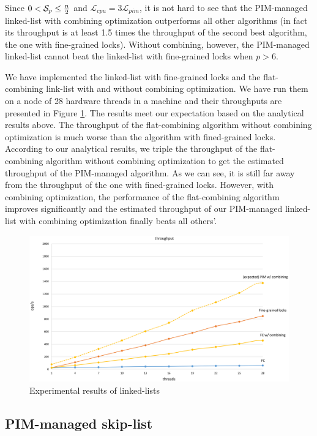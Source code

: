 \documentclass[11pt, letterpaper]{article}   	%
\newcommand{\latpim} {\mathcal{L}_{pim}}
\newcommand{\latcpu} {\mathcal{L}_{cpu}}
\newcommand{\Sp}{\mathcal{S}_{p}}
\begin{document}
Since $0 < \Sp \le {n \over 2}$ and $\latcpu = 3\latpim$,
it is not hard to see that the PIM-managed linked-list with
combining optimization outperforms all other algorithms
(in fact its throughput is at least 1.5 times the throughput of
the second best algorithm, the one with fine-grained locks).
Without combining, however, the PIM-managed linked-list cannot
beat the linked-list with fine-grained locks when $p > 6$.

We have implemented the linked-list with fine-grained locks
and the flat-combining link-list with and without combining optimization.
We have run them on a node of 28 hardware threads in a machine
and their throughputs are presented in Figure \ref{figure:linkedlist_data}.
The results meet our expectation based on the analytical results above.
The throughput of the flat-combining algorithm without combining optimization
is much worse than the algorithm with fined-grained locks.
According to our analytical results, we triple the throughput of the
flat-combining algorithm without combining optimization to get the estimated
throughput of the PIM-managed algorithm. As we can see,
it is still far away from the throughput of the one with fined-grained locks.
However, with combining optimization, the performance of the flat-combining
algorithm improves significantly and the estimated throughput of our PIM-managed
linked-list with combining optimization finally beats all others'.

\begin{figure}[ht!]
\centering
\includegraphics[width=.8\linewidth]{linkedlist_data.eps}
\caption{Experimental results of linked-lists}
\label{figure:linkedlist_data}
\end{figure}

\subsection{PIM-managed skip-list}
\label{section:skip_list}
\end{document}
